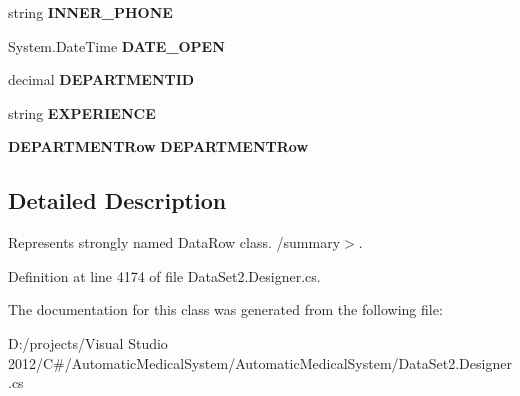 \begin{CompactItemize}
\item 
string \textbf{INNER\_\-PHONE}\hspace{0.3cm}{\tt  [get, set]}\label{class_automatic_medical_system_1_1_data_set2_1_1_d_o_c_t_o_r_s_row_31903558ef5b0a176662c11aaac8a195}

\item 
System.DateTime \textbf{DATE\_\-OPEN}\hspace{0.3cm}{\tt  [get, set]}\label{class_automatic_medical_system_1_1_data_set2_1_1_d_o_c_t_o_r_s_row_174475aeaa81b1a9562285db8ed59456}

\item 
decimal \textbf{DEPARTMENTID}\hspace{0.3cm}{\tt  [get, set]}\label{class_automatic_medical_system_1_1_data_set2_1_1_d_o_c_t_o_r_s_row_94fbd0f0fb764e5500638b392ed3e67e}

\item 
string \textbf{EXPERIENCE}\hspace{0.3cm}{\tt  [get, set]}\label{class_automatic_medical_system_1_1_data_set2_1_1_d_o_c_t_o_r_s_row_56c89296102eef0fa3da1c1486e6dda9}

\item 
{\bf DEPARTMENTRow} \textbf{DEPARTMENTRow}\hspace{0.3cm}{\tt  [get, set]}\label{class_automatic_medical_system_1_1_data_set2_1_1_d_o_c_t_o_r_s_row_c5cb22e77b10985a3b4374d1c3025383}

\end{CompactItemize}


\subsection{Detailed Description}
Represents strongly named DataRow class. /summary$>$. 

Definition at line 4174 of file DataSet2.Designer.cs.

The documentation for this class was generated from the following file:\begin{CompactItemize}
\item 
D:/projects/Visual Studio 2012/C\#/AutomaticMedicalSystem/AutomaticMedicalSystem/DataSet2.Designer.cs\end{CompactItemize}
